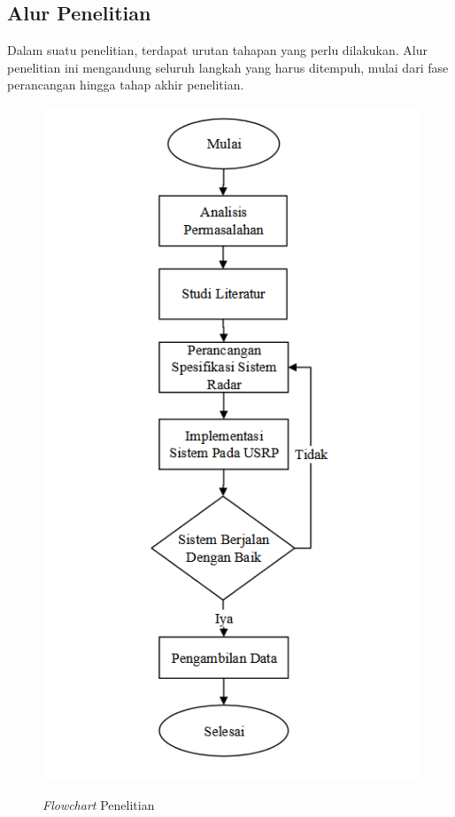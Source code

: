 \chapter{\babTiga}

\section{Alur Penelitian}
Dalam suatu penelitian, terdapat urutan tahapan yang perlu dilakukan. Alur penelitian ini mengandung seluruh langkah yang harus ditempuh, mulai dari fase perancangan hingga tahap akhir penelitian.
 \begin{figure}
	\begin{center}
		\includegraphics[scale=0.6]{pics/bab3/flowchart.png} 
		\label{img:gambar 1}
		\caption[\textit{Flowchart} Penelitian]{\textit{Flowchart} Penelitian}
	\end{center}
\end{figure}
